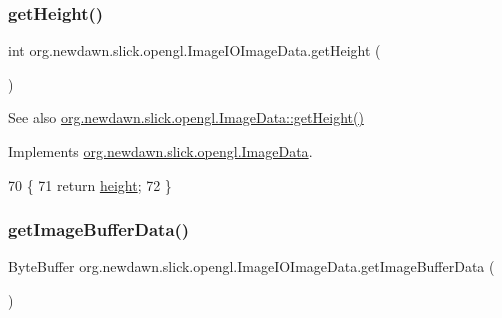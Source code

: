\subsubsection{\texorpdfstring{get\+Height()}{getHeight()}}
{\footnotesize\ttfamily int org.\+newdawn.\+slick.\+opengl.\+Image\+I\+O\+Image\+Data.\+get\+Height (\begin{DoxyParamCaption}{ }\end{DoxyParamCaption})\hspace{0.3cm}{\ttfamily [inline]}}

\begin{DoxySeeAlso}{See also}
\mbox{\hyperlink{interfaceorg_1_1newdawn_1_1slick_1_1opengl_1_1_image_data_acce23925ae561e75f051d3287a8dda06}{org.\+newdawn.\+slick.\+opengl.\+Image\+Data\+::get\+Height()}} 
\end{DoxySeeAlso}


Implements \mbox{\hyperlink{interfaceorg_1_1newdawn_1_1slick_1_1opengl_1_1_image_data_acce23925ae561e75f051d3287a8dda06}{org.\+newdawn.\+slick.\+opengl.\+Image\+Data}}.


\begin{DoxyCode}
70                            \{
71         \textcolor{keywordflow}{return} \mbox{\hyperlink{classorg_1_1newdawn_1_1slick_1_1opengl_1_1_image_i_o_image_data_af79cc456f73fe9b84d5803f4fb41348b}{height}};
72     \}
\end{DoxyCode}
\mbox{\label{classorg_1_1newdawn_1_1slick_1_1opengl_1_1_image_i_o_image_data_a7856e0622b9fcfc5f8667ec4543ed8d0}} 
\subsubsection{\texorpdfstring{get\+Image\+Buffer\+Data()}{getImageBufferData()}}
{\footnotesize\ttfamily Byte\+Buffer org.\+newdawn.\+slick.\+opengl.\+Image\+I\+O\+Image\+Data.\+get\+Image\+Buffer\+Data (\begin{DoxyParamCaption}{ }\end{DoxyParamCaption})\hspace{0.3cm}{\ttfamily [inline]}}

